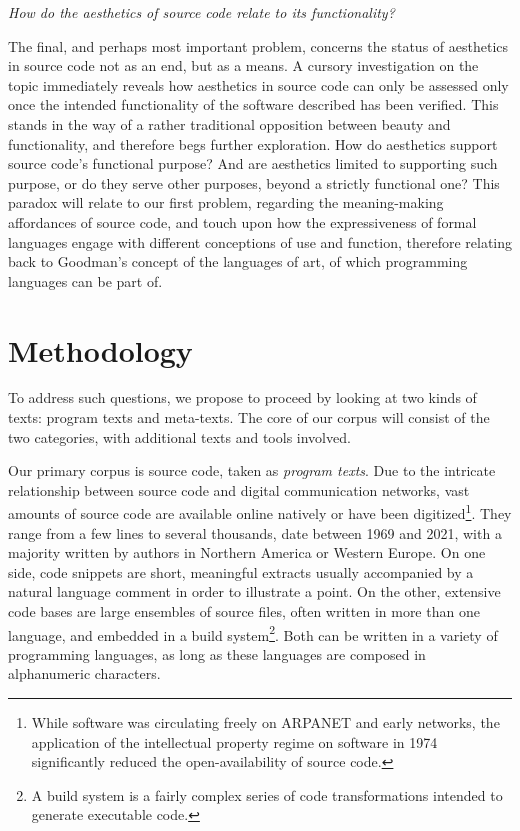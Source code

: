 \vspace{1\baselineskip}

\emph{How do the aesthetics of source code relate to its functionality?}

The final, and perhaps most important problem, concerns the status of aesthetics in source code not as an end, but as a means. A cursory investigation on the topic immediately reveals how aesthetics in source code can only be assessed only once the intended functionality of the software described has been verified. This stands in the way of a rather traditional opposition between beauty and functionality, and therefore begs further exploration. How do aesthetics support source code's functional purpose? And are aesthetics limited to supporting such purpose, or do they serve other purposes, beyond a strictly functional one? This paradox will relate to our first problem, regarding the meaning-making affordances of source code, and touch upon how the expressiveness of formal languages engage with different conceptions of use and function, therefore relating back to Goodman's concept of the languages of art, of which programming languages can be part of.

\section{Methodology}

To address such questions, we propose to proceed by looking at two kinds of texts: program texts and meta-texts. The core of our corpus will consist of the two categories, with additional texts and tools involved.

Our primary corpus is source code, taken as \emph{program texts}. Due to the intricate relationship between source code and digital communication networks, vast amounts of source code are available online natively or have been digitized\footnote{While software was circulating freely on ARPANET and early networks, the application of the intellectual property regime on software in 1974 significantly reduced the open-availability of source code.}. They range from a few lines to several thousands, date between 1969 and 2021, with a majority written by authors in Northern America or Western Europe. On one side, code snippets are short, meaningful extracts usually accompanied by a natural language comment in order to illustrate a point. On the other, extensive code bases are large ensembles of source files, often written in more than one language, and embedded in a build system\footnote{A build system is a fairly complex series of code transformations intended to generate executable code.}. Both can be written in a variety of programming languages, as long as these languages are composed in alphanumeric characters.

